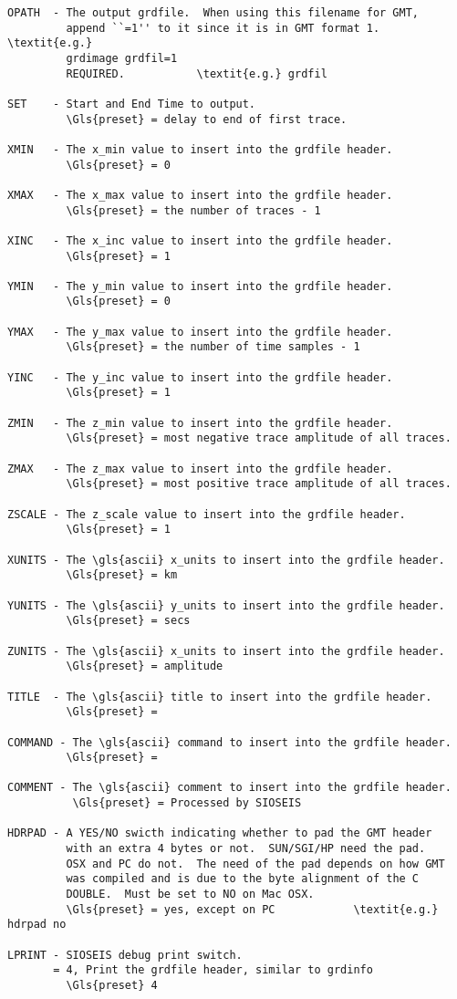 \begin{verbatim}
OPATH  - The output grdfile.  When using this filename for GMT,
         append ``=1'' to it since it is in GMT format 1.  \textit{e.g.}
         grdimage grdfil=1
         REQUIRED.           \textit{e.g.} grdfil

SET    - Start and End Time to output.
         \Gls{preset} = delay to end of first trace.

XMIN   - The x_min value to insert into the grdfile header.
         \Gls{preset} = 0

XMAX   - The x_max value to insert into the grdfile header.
         \Gls{preset} = the number of traces - 1

XINC   - The x_inc value to insert into the grdfile header.
         \Gls{preset} = 1

YMIN   - The y_min value to insert into the grdfile header.
         \Gls{preset} = 0

YMAX   - The y_max value to insert into the grdfile header.
         \Gls{preset} = the number of time samples - 1

YINC   - The y_inc value to insert into the grdfile header.
         \Gls{preset} = 1

ZMIN   - The z_min value to insert into the grdfile header.
         \Gls{preset} = most negative trace amplitude of all traces.

ZMAX   - The z_max value to insert into the grdfile header.
         \Gls{preset} = most positive trace amplitude of all traces.

ZSCALE - The z_scale value to insert into the grdfile header.
         \Gls{preset} = 1

XUNITS - The \gls{ascii} x_units to insert into the grdfile header.
         \Gls{preset} = km

YUNITS - The \gls{ascii} y_units to insert into the grdfile header.
         \Gls{preset} = secs

ZUNITS - The \gls{ascii} x_units to insert into the grdfile header.
         \Gls{preset} = amplitude

TITLE  - The \gls{ascii} title to insert into the grdfile header.
         \Gls{preset} =

COMMAND - The \gls{ascii} command to insert into the grdfile header.
         \Gls{preset} =

COMMENT - The \gls{ascii} comment to insert into the grdfile header.
          \Gls{preset} = Processed by SIOSEIS

HDRPAD - A YES/NO swicth indicating whether to pad the GMT header
         with an extra 4 bytes or not.  SUN/SGI/HP need the pad.
         OSX and PC do not.  The need of the pad depends on how GMT
         was compiled and is due to the byte alignment of the C
         DOUBLE.  Must be set to NO on Mac OSX.
         \Gls{preset} = yes, except on PC            \textit{e.g.}   hdrpad no

LPRINT - SIOSEIS debug print switch.
       = 4, Print the grdfile header, similar to grdinfo
         \Gls{preset} 4
\end{verbatim}

